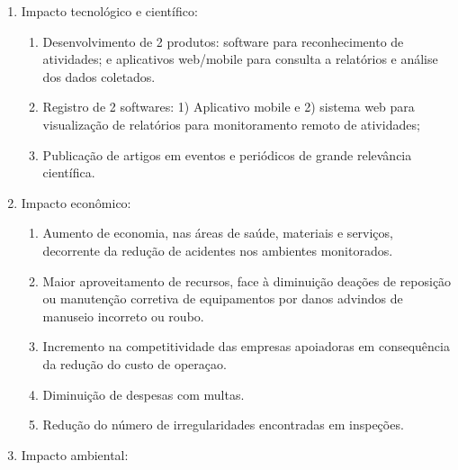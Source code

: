\begin{enumerate}
	\item Impacto tecnológico e científico:
		\begin{enumerate}
			\item Desenvolvimento de 2 produtos: software para reconhecimento de atividades; e aplicativos web/mobile para consulta a relatórios e análise dos dados coletados.
			\item Registro de 2 softwares: 1) Aplicativo mobile e 2) sistema web para visualização de relatórios para monitoramento remoto de atividades; 
			\item Publicação de artigos em eventos e periódicos de grande relevância científica.
		\end{enumerate}
	\item Impacto econômico:
		\begin{enumerate}
			\item Aumento de economia, nas áreas de saúde, materiais e serviços, decorrente da redução de acidentes nos ambientes monitorados.
			\item Maior aproveitamento de recursos, face à diminuição deações de reposição ou manutenção corretiva de equipamentos por danos advindos de manuseio incorreto ou roubo.
			\item Incremento na competitividade das empresas apoiadoras em consequência da redução do custo de operaçao.
			\item Diminuição de despesas com multas.
			\item Redução do número de irregularidades encontradas em inspeções.
		\end{enumerate}
	\item Impacto ambiental:
		\begin{enumerate}

\end{enumerate}
\end{enumerate}
